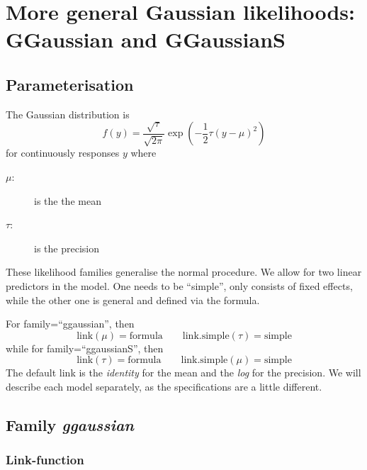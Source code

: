 \documentclass[a4paper,11pt]{article}
\begin{document}
\section*{More general Gaussian likelihoods: GGaussian and GGaussianS}

\subsection*{Parameterisation}

The Gaussian distribution is
\begin{displaymath}
    f(y) = \frac{\sqrt{\tau}}{\sqrt{2\pi}} \exp\left( -\frac{1}{2}
      \tau \left(y-\mu\right)^{2}\right)
\end{displaymath}
for continuously responses $y$ where
\begin{description}
\item[$\mu$:] is the the mean
\item[$\tau$:] is the precision
\end{description}
These likelihood families generalise the normal procedure. We allow
for two linear predictors in the model. One needs to be ``simple'',
only consists of fixed effects, while the other one is general and
defined via the formula.

For family=``ggaussian'', then
\begin{displaymath}
    \text{link}(\mu) = \text{formula} \qquad
    \text{link.simple}(\tau) = \text{simple}
\end{displaymath}
while for family=``ggaussianS'', then
\begin{displaymath}
    \text{link}(\tau) = \text{formula} \qquad
    \text{link.simple}(\mu) = \text{simple}
\end{displaymath}
The default link is the \emph{identity} for the mean and the
\emph{log} for the precision. We will describe each model separately,
as the specifications are a little different.

\subsection*{Family \emph{ggaussian}}
\subsubsection*{Link-function}
\end{document}
